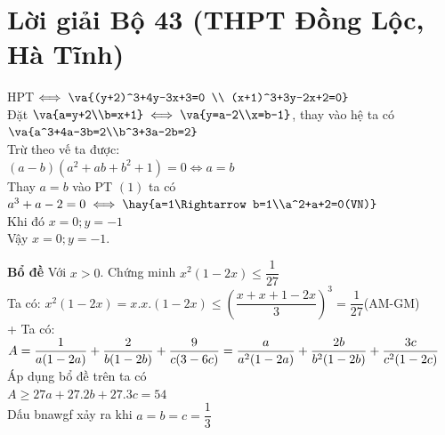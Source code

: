 \section{Lời giải Bộ 43 (THPT Đồng Lộc, Hà Tĩnh)}

\lgi 
\vspace{5cm}

\hda 
HPT$\iff \va{(y+2)^3+4y-3x+3=0 \\ (x+1)^3+3y-2x+2=0}$\\
Đặt $\va{a=y+2\\b=x+1}\iff \va{y=a-2\\x=b-1}$, thay vào hệ ta có\\
$\va{a^3+4a-3b=2\\b^3+3a-2b=2}$\\
Trừ theo vế ta được:\\
$(a-b)(a^2+ab+b^2+1)=0\iff a=b$\\
Thay $a=b$ vào PT $(1)$ ta có\\
$a^3+a-2=0\iff \hay{a=1\Rightarrow b=1\\a^2+a+2=0(VN)}$\\
Khi đó $x=0;y=-1$\\
Vậy $x=0;y=-1$.



\hda 
\textbf{Bổ đề} Với $x>0$. Chứng minh $x^2(1-2x)\le \dfrac{1}{27}$\\
Ta có: $x^2(1-2x)=x.x.(1-2x)\le \left(\dfrac{x+x+1-2x}{3}\right)^3=\dfrac{1}{27}$(AM-GM)\\
+ Ta có:\\
$A=\dfrac{1}{a(1-2a)}+\dfrac{2}{b(1-2b)}+\dfrac{9}{c(3-6c)}\\
=\dfrac{a}{a^2(1-2a)}+\dfrac{2b}{b^2(1-2b)}+\dfrac{3c}{c^2(1-2c)}$\\
Áp dụng bổ đề trên ta có\\
$A\ge 27a+27.2b+27.3c=54$\\
Dấu bnawgf xảy ra khi $a=b=c=\dfrac{1}{3}$\\

